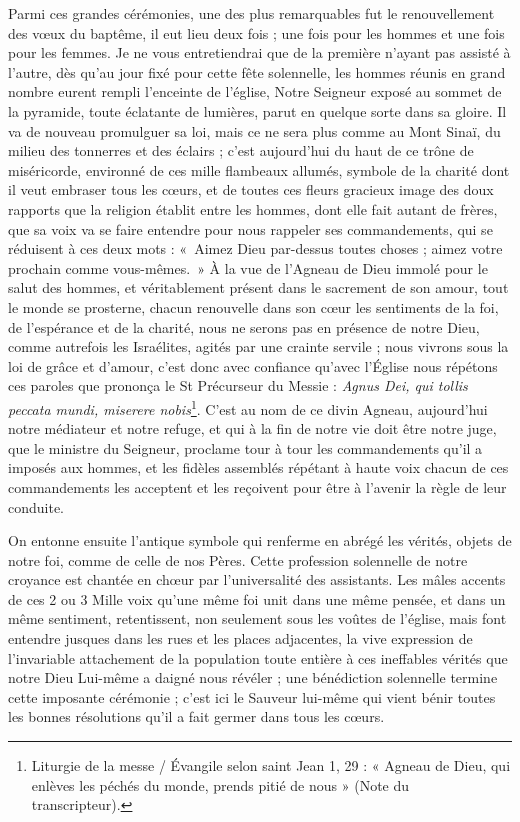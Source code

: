 \documentclass[11pt,a4paper]{report}
\begin{document}
Parmi ces grandes cérémonies, une des plus remarquables fut le renouvellement des vœux du baptême, il eut lieu deux fois ; une fois pour les hommes et une fois pour les femmes. Je ne vous entretiendrai que de la première n'ayant pas assisté à l'autre, dès qu'au jour fixé pour cette fête solennelle, les hommes réunis en grand nombre eurent rempli l'enceinte de l'église, Notre Seigneur exposé au sommet de la pyramide, toute éclatante de lumières, parut en quelque sorte dans sa gloire. Il va de nouveau promulguer sa loi, mais ce ne sera plus comme au Mont Sinaï, du milieu des tonnerres et des éclairs ; c'est aujourd'hui du haut de ce trône de miséricorde, environné de ces mille flambeaux allumés, symbole de la charité dont il veut embraser tous les cœurs, et de toutes ces fleurs gracieux image des doux rapports que la religion établit entre les hommes, dont elle fait autant de frères, que sa voix va se faire entendre pour nous rappeler ses commandements, qui se réduisent à ces deux mots : «~Aimez Dieu par-dessus toutes choses ; aimez votre prochain comme vous-mêmes.~» À la vue de l'Agneau de Dieu immolé pour le salut des hommes, et véritablement présent dans le sacrement de son amour, tout le monde se prosterne, chacun renouvelle dans son cœur les sentiments de la foi, de l'espérance et de la charité, nous ne serons pas en présence de notre Dieu, comme autrefois les Israélites, agités par une crainte servile ; nous vivrons sous la loi de grâce et d'amour, c'est donc avec confiance qu'avec l'Église nous répétons ces paroles que prononça le St Précurseur du Messie : \textit{Agnus Dei, qui tollis peccata mundi, miserere nobis}\footnote{Liturgie de la messe / Évangile selon saint Jean 1, 29 : « Agneau de Dieu, qui enlèves les péchés du monde, prends pitié de nous » (Note du transcripteur).}. C'est au nom de ce divin Agneau, aujourd'hui notre médiateur et notre refuge, et qui à la fin de notre vie doit être notre juge, que le ministre du Seigneur, proclame tour à tour les commandements qu'il a imposés aux hommes, et les fidèles assemblés répétant à haute voix chacun de ces commandements les acceptent et les reçoivent pour être à l'avenir la règle de leur conduite.

On entonne ensuite l'antique symbole qui renferme en abrégé les vérités, objets de notre foi, comme de celle de nos Pères. Cette profession solennelle de notre croyance est chantée en chœur par l'universalité des assistants. Les mâles accents de ces 2 ou 3 Mille voix qu'une même foi unit dans une même pensée, et dans un même sentiment, retentissent, non seulement sous les voûtes de l'église, mais font entendre jusques dans les rues et les places adjacentes, la vive expression de l'invariable attachement de la population toute entière à ces ineffables vérités que notre Dieu Lui-même a daigné nous révéler ; une bénédiction solennelle termine cette imposante cérémonie ; c'est ici le Sauveur lui-même qui vient bénir toutes les bonnes résolutions qu'il a fait germer dans tous les cœurs.
\end{document}
